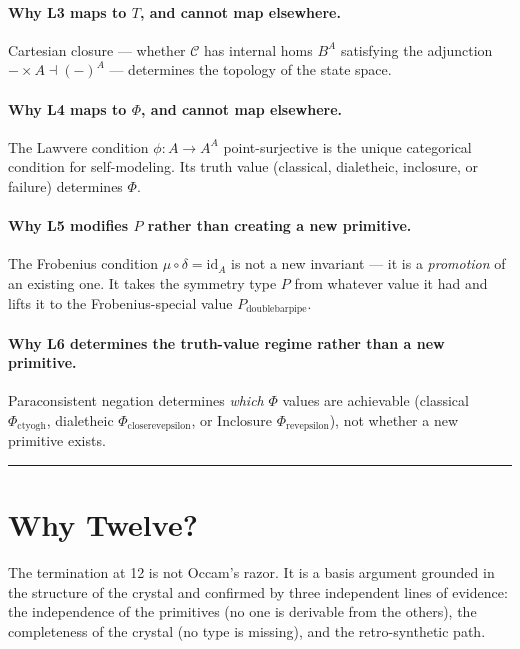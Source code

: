 \documentclass[12pt,a4paper]{article}
\begin{document}
\paragraph{Why L3 maps to $T$, and cannot map elsewhere.}
Cartesian closure --- whether $\mathcal{C}$ has internal homs $B^A$ satisfying the adjunction $-\times A \dashv (-)^A$ --- determines the topology of the state space.

\paragraph{Why L4 maps to $\Phi$, and cannot map elsewhere.}
The Lawvere condition $\phi: A \to A^A$ point-surjective is the unique categorical condition for self-modeling. Its truth value (classical, dialetheic, inclosure, or failure) determines $\Phi$.

\paragraph{Why L5 modifies $P$ rather than creating a new primitive.}
The Frobenius condition $\mu \circ \delta = \text{id}_A$ is not a new invariant --- it is a \emph{promotion} of an existing one. It takes the symmetry type $P$ from whatever value it had and lifts it to the Frobenius-special value $P_{\text{doublebarpipe}}$.

\paragraph{Why L6 determines the truth-value regime rather than a new primitive.}
Paraconsistent negation determines \emph{which} $\Phi$ values are achievable (classical $\Phi_{\text{ctyogh}}$, dialetheic $\Phi_{\text{closerevepsilon}}$, or Inclosure $\Phi_{\text{revepsilon}}$), not whether a new primitive exists.

\begin{center}
\rule{0.5\textwidth}{0.4pt}
\end{center}
\section{Why Twelve?}

The termination at 12 is not Occam's razor. It is a basis argument grounded in the structure of the crystal and confirmed by three independent lines of evidence: the independence of the primitives (no one is derivable from the others), the completeness of the crystal (no type is missing), and the retro-synthetic path.
\end{document}

